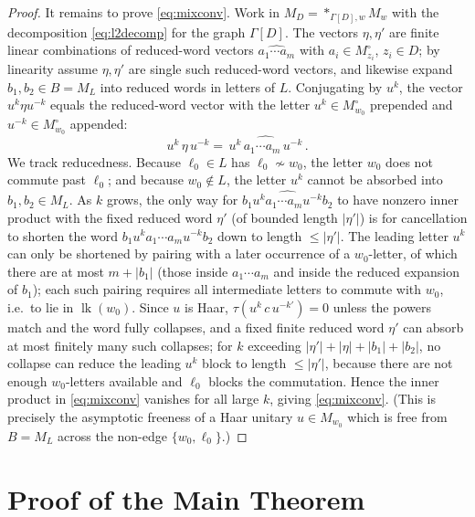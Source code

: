 \documentclass[11pt]{article}
\DeclareMathOperator{\link}{lk}
\newcommand{\Gra}{\Gamma}
\newcommand{\abs}[1]{\lvert #1\rvert}
\newcommand{\set}[1]{\{#1\}}
\begin{document}
\begin{proof}
It remains to prove \eqref{eq:mixconv}. Work in $M_D=\ast_{\Gra[D],w}M_w$ with the decomposition
\eqref{eq:l2decomp} for the graph $\Gra[D]$. The vectors $\eta,\eta'$ are finite linear combinations of
reduced-word vectors $\widehat{a_1\cdots a_m}$ with $a_i\in M_{z_i}^\circ$, $z_i\in D$; by linearity assume
$\eta,\eta'$ are single such reduced-word vectors, and likewise expand $b_1,b_2\in B=M_L$ into reduced words
in letters of $L$. Conjugating by $u^k$, the vector $u^k\eta u^{-k}$ equals the reduced-word vector with the
letter $u^k\in M_{w_0}^\circ$ prepended and $u^{-k}\in M_{w_0}^\circ$ appended:
\[
u^{k}\,\eta\,u^{-k}=\widehat{\,u^{k}\,a_1\cdots a_m\,u^{-k}\,}.
\]
We track reducedness. Because $\ell_0\in L$ has $\ell_0\not\sim w_0$, the letter $w_0$ does not commute past
$\ell_0$; and because $w_0\notin L$, the letter $u^k$ cannot be absorbed into $b_1,b_2\in M_L$. As $k$ grows,
the only way for $\widehat{b_1 u^k a_1\cdots a_m u^{-k} b_2}$ to have nonzero inner product with the fixed
reduced word $\eta'$ (of bounded length $\abs{\eta'}$) is for cancellation to shorten the word
$b_1 u^k a_1\cdots a_m u^{-k} b_2$ down to length $\le\abs{\eta'}$. The leading letter $u^k$ can only be
shortened by pairing with a later occurrence of a $w_0$-letter, of which there are at most $m+\abs{b_1}$
(those inside $a_1\cdots a_m$ and inside the reduced expansion of $b_1$); each such pairing requires all
intermediate letters to commute with $w_0$, i.e.\ to lie in $\link(w_0)$. Since $u$ is Haar,
$\tau(u^{k}\,c\,u^{-k'})=0$ unless the powers match and the word fully collapses, and a fixed finite reduced
word $\eta'$ can absorb at most finitely many such collapses; for $k$ exceeding
$\abs{\eta'}+\abs{\eta}+\abs{b_1}+\abs{b_2}$, no collapse can reduce the leading $u^k$ block to length
$\le\abs{\eta'}$, because there are not enough $w_0$-letters available and $\ell_0$ blocks the commutation.
Hence the inner product in \eqref{eq:mixconv} vanishes for all large $k$, giving \eqref{eq:mixconv}. (This is
precisely the asymptotic freeness of a Haar unitary $u\in M_{w_0}$ which is free from $B=M_L$ across the
non-edge $\set{w_0,\ell_0}$.)
\end{proof}

\section{Proof of the Main Theorem}\label{sec:mainproof}
\end{document}
